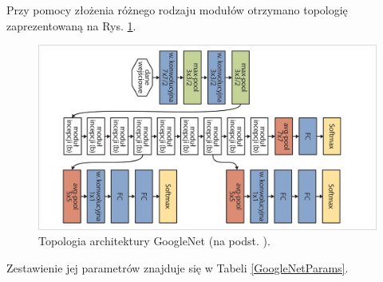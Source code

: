 Przy pomocy złożenia różnego rodzaju modułów otrzymano topologię zaprezentowaną na Rys. \ref{GoogleNetTopo}.
\begin{figure}[h!]
	\centering
	\includegraphics[width=1\textwidth]{figures/GoogleNet.jpg}
	\caption{Topologia architektury GoogleNet (na podst. \cite{GoogleNet}).}
	\label{GoogleNetTopo}
\end{figure}
Zestawienie jej parametrów znajduje się w Tabeli \ref{GoogleNetParams}.
\renewcommand{\arraystretch}{1.2}
